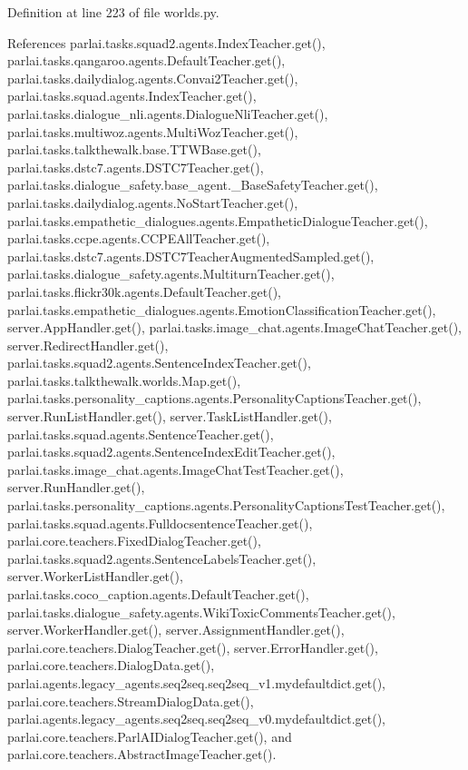 Definition at line 223 of file worlds.\+py.



References parlai.\+tasks.\+squad2.\+agents.\+Index\+Teacher.\+get(), parlai.\+tasks.\+qangaroo.\+agents.\+Default\+Teacher.\+get(), parlai.\+tasks.\+dailydialog.\+agents.\+Convai2\+Teacher.\+get(), parlai.\+tasks.\+squad.\+agents.\+Index\+Teacher.\+get(), parlai.\+tasks.\+dialogue\+\_\+nli.\+agents.\+Dialogue\+Nli\+Teacher.\+get(), parlai.\+tasks.\+multiwoz.\+agents.\+Multi\+Woz\+Teacher.\+get(), parlai.\+tasks.\+talkthewalk.\+base.\+T\+T\+W\+Base.\+get(), parlai.\+tasks.\+dstc7.\+agents.\+D\+S\+T\+C7\+Teacher.\+get(), parlai.\+tasks.\+dialogue\+\_\+safety.\+base\+\_\+agent.\+\_\+\+Base\+Safety\+Teacher.\+get(), parlai.\+tasks.\+dailydialog.\+agents.\+No\+Start\+Teacher.\+get(), parlai.\+tasks.\+empathetic\+\_\+dialogues.\+agents.\+Empathetic\+Dialogue\+Teacher.\+get(), parlai.\+tasks.\+ccpe.\+agents.\+C\+C\+P\+E\+All\+Teacher.\+get(), parlai.\+tasks.\+dstc7.\+agents.\+D\+S\+T\+C7\+Teacher\+Augmented\+Sampled.\+get(), parlai.\+tasks.\+dialogue\+\_\+safety.\+agents.\+Multiturn\+Teacher.\+get(), parlai.\+tasks.\+flickr30k.\+agents.\+Default\+Teacher.\+get(), parlai.\+tasks.\+empathetic\+\_\+dialogues.\+agents.\+Emotion\+Classification\+Teacher.\+get(), server.\+App\+Handler.\+get(), parlai.\+tasks.\+image\+\_\+chat.\+agents.\+Image\+Chat\+Teacher.\+get(), server.\+Redirect\+Handler.\+get(), parlai.\+tasks.\+squad2.\+agents.\+Sentence\+Index\+Teacher.\+get(), parlai.\+tasks.\+talkthewalk.\+worlds.\+Map.\+get(), parlai.\+tasks.\+personality\+\_\+captions.\+agents.\+Personality\+Captions\+Teacher.\+get(), server.\+Run\+List\+Handler.\+get(), server.\+Task\+List\+Handler.\+get(), parlai.\+tasks.\+squad.\+agents.\+Sentence\+Teacher.\+get(), parlai.\+tasks.\+squad2.\+agents.\+Sentence\+Index\+Edit\+Teacher.\+get(), parlai.\+tasks.\+image\+\_\+chat.\+agents.\+Image\+Chat\+Test\+Teacher.\+get(), server.\+Run\+Handler.\+get(), parlai.\+tasks.\+personality\+\_\+captions.\+agents.\+Personality\+Captions\+Test\+Teacher.\+get(), parlai.\+tasks.\+squad.\+agents.\+Fulldocsentence\+Teacher.\+get(), parlai.\+core.\+teachers.\+Fixed\+Dialog\+Teacher.\+get(), parlai.\+tasks.\+squad2.\+agents.\+Sentence\+Labels\+Teacher.\+get(), server.\+Worker\+List\+Handler.\+get(), parlai.\+tasks.\+coco\+\_\+caption.\+agents.\+Default\+Teacher.\+get(), parlai.\+tasks.\+dialogue\+\_\+safety.\+agents.\+Wiki\+Toxic\+Comments\+Teacher.\+get(), server.\+Worker\+Handler.\+get(), server.\+Assignment\+Handler.\+get(), parlai.\+core.\+teachers.\+Dialog\+Teacher.\+get(), server.\+Error\+Handler.\+get(), parlai.\+core.\+teachers.\+Dialog\+Data.\+get(), parlai.\+agents.\+legacy\+\_\+agents.\+seq2seq.\+seq2seq\+\_\+v1.\+mydefaultdict.\+get(), parlai.\+core.\+teachers.\+Stream\+Dialog\+Data.\+get(), parlai.\+agents.\+legacy\+\_\+agents.\+seq2seq.\+seq2seq\+\_\+v0.\+mydefaultdict.\+get(), parlai.\+core.\+teachers.\+Parl\+A\+I\+Dialog\+Teacher.\+get(), and parlai.\+core.\+teachers.\+Abstract\+Image\+Teacher.\+get().

